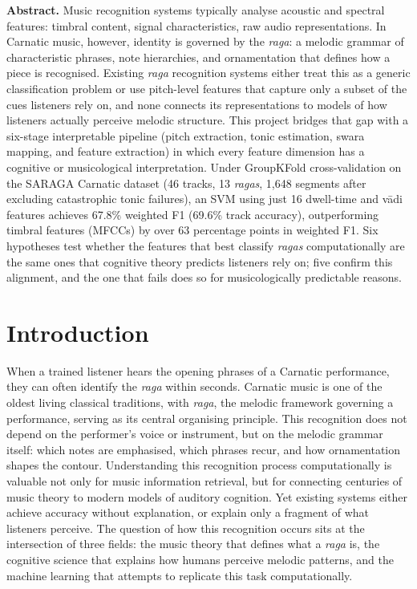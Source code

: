 \documentclass[11pt,a4paper]{article}
\begin{document}
{\small
\noindent\textbf{Abstract.}
Music recognition systems typically analyse acoustic and spectral features: timbral content, signal characteristics, raw audio representations. In Carnatic music, however, identity is governed by the \textit{raga}: a melodic grammar of characteristic phrases, note hierarchies, and ornamentation that defines how a piece is recognised. Existing \textit{raga} recognition systems either treat this as a generic classification problem or use pitch-level features that capture only a subset of the cues listeners rely on, and none connects its representations to models of how listeners actually perceive melodic structure. This project bridges that gap with a six-stage interpretable pipeline (pitch extraction, tonic estimation, swara mapping, and feature extraction) in which every feature dimension has a cognitive or musicological interpretation. Under GroupKFold cross-validation on the SARAGA Carnatic dataset (46 tracks, 13 \textit{ragas}, 1,648 segments after excluding catastrophic tonic failures), an SVM using just 16 dwell-time and v\=adi features achieves 67.8\% weighted F1 (69.6\% track accuracy), outperforming timbral features (MFCCs) by over 63 percentage points in weighted F1. Six hypotheses test whether the features that best classify \textit{ragas} computationally are the same ones that cognitive theory predicts listeners rely on; five confirm this alignment, and the one that fails does so for musicologically predictable reasons.
\vspace{0.2cm}
\section{Introduction}

When a trained listener hears the opening phrases of a Carnatic performance, they can often identify the \textit{raga} within seconds. Carnatic music is one of the oldest living classical traditions, with \textit{raga}, the melodic framework governing a performance, serving as its central organising principle. This recognition does not depend on the performer's voice or instrument, but on the melodic grammar itself: which notes are emphasised, which phrases recur, and how ornamentation shapes the contour. Understanding this recognition process computationally is valuable not only for music information retrieval, but for connecting centuries of music theory to modern models of auditory cognition. Yet existing systems either achieve accuracy without explanation, or explain only a fragment of what listeners perceive. The question of how this recognition occurs sits at the intersection of three fields: the music theory that defines what a \textit{raga} is, the cognitive science that explains how humans perceive melodic patterns, and the machine learning that attempts to replicate this task computationally.

}
\end{document}
